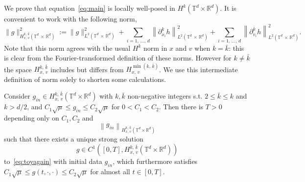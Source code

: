 \documentclass[AHL,Unicode,longabstracts,published]{cedram}
\newcommand{\R}{\mathbb{R}}
\newcommand{\T}{\mathbb{T}}
\begin{document}
We prove that equation~\eqref{eq:main} is locally well-posed in $H^k (\T^d \times \R^d)$. It is convenient to work with the following norm,
\[
\| g \|_{H^{k,\,\bar k}_{x,\,v}\left(\T^d\,\times\,\R^d\right)} ^2 := \| g \|_{L^2\left(\T^d\,\times\,\R^d\right)} ^2 + \sum_{i=1,\,\dots,\,d} \left\| \partial_{x_i} ^k h\right\|_{L^2\left(\T^d\,\times\,\R^d\right)}^2 + \sum_{i=1,\,\dots,\,d} \left\| \partial_{v_i} ^{\bar k} h\right\|_{L^2\left(\T^d\,\times\,\R^d\right)}^2.
\]
Note that this norm agrees with the usual $H^k$ norm in $x$ and $v$ when $k = \bar k$: this is clear from the Fourier-transformed definition of these norms. However for $k \not = \bar k$ the space $H^{k,\,\bar k}_{x,\,v}$ includes but differs from $H^{\min(k,\,\bar k)}_{x,\,v}$. We use this intermediate definition of norm solely to shorten some calculations.


\begin{theo}\label{t:loc-exis}
Consider
$
g_{in} \in H^{k,\,\bar k}_{x,\,v}(\T^d \times \R^d)
$
with $k,{\bar k}$ non-negative integers s.t. $2 \le{\bar k} \le k$ and $k > d/2$, and $C_1 \sqrt{\mu} \le g_{in} \le C_2 \sqrt{\mu}$ for $0 < C_1 < C_2$. Then there is $T>0$ depending only on $C_1, C_2$ and
\[
\left\|g_{in}\right\|_{H^{k,\,\bar k}_{x,\,v}\left(\T^d \times \R^d\right)}
\]
such that there exists a unique strong solution
\[
g \in C^1\left([0,T],H^{k,\,\bar k}_{x,\,v}\left(\T^d \times \R^d\right)\right)
\]
to~\eqref{eq:toyagain} with initial data $g_{in}$, which furthermore satisfies $C_1 \sqrt{\mu} \le g (t,\cdot,\cdot) \le C_2 \sqrt{\mu}$ for almost all $t \in [0,T]$.
\end{theo}
\end{document}
